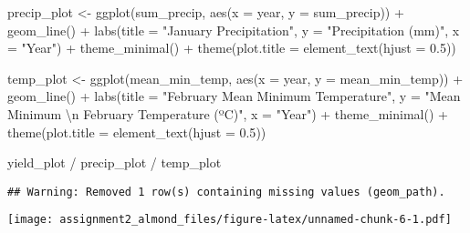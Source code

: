 \documentclass[
]{article}
\newenvironment{Shaded}{\begin{snugshade}}{\end{snugshade}}
\newcommand{\AttributeTok}[1]{\textcolor[rgb]{0.77,0.63,0.00}{#1}}
\newcommand{\FloatTok}[1]{\textcolor[rgb]{0.00,0.00,0.81}{#1}}
\newcommand{\FunctionTok}[1]{\textcolor[rgb]{0.00,0.00,0.00}{#1}}
\newcommand{\NormalTok}[1]{#1}
\newcommand{\OtherTok}[1]{\textcolor[rgb]{0.56,0.35,0.01}{#1}}
\newcommand{\SpecialCharTok}[1]{\textcolor[rgb]{0.00,0.00,0.00}{#1}}
\newcommand{\StringTok}[1]{\textcolor[rgb]{0.31,0.60,0.02}{#1}}
\begin{document}
\begin{Shaded}
\begin{Highlighting}[]
\NormalTok{precip\_plot }\OtherTok{\textless{}{-}} \FunctionTok{ggplot}\NormalTok{(sum\_precip, }\FunctionTok{aes}\NormalTok{(}\AttributeTok{x =}\NormalTok{ year, }\AttributeTok{y =}\NormalTok{ sum\_precip)) }\SpecialCharTok{+}
  \FunctionTok{geom\_line}\NormalTok{() }\SpecialCharTok{+}
  \FunctionTok{labs}\NormalTok{(}\AttributeTok{title =} \StringTok{"January Precipitation"}\NormalTok{, }\AttributeTok{y =} \StringTok{"Precipitation (mm)"}\NormalTok{, }\AttributeTok{x =} \StringTok{"Year"}\NormalTok{) }\SpecialCharTok{+}
  \FunctionTok{theme\_minimal}\NormalTok{() }\SpecialCharTok{+}
  \FunctionTok{theme}\NormalTok{(}\AttributeTok{plot.title =} \FunctionTok{element\_text}\NormalTok{(}\AttributeTok{hjust =} \FloatTok{0.5}\NormalTok{))}

\NormalTok{temp\_plot }\OtherTok{\textless{}{-}} \FunctionTok{ggplot}\NormalTok{(mean\_min\_temp, }\FunctionTok{aes}\NormalTok{(}\AttributeTok{x =}\NormalTok{ year, }\AttributeTok{y =}\NormalTok{ mean\_min\_temp)) }\SpecialCharTok{+}
  \FunctionTok{geom\_line}\NormalTok{() }\SpecialCharTok{+}
  \FunctionTok{labs}\NormalTok{(}\AttributeTok{title =} \StringTok{"February Mean Minimum Temperature"}\NormalTok{, }\AttributeTok{y =} \StringTok{"Mean Minimum }\SpecialCharTok{\textbackslash{}n}\StringTok{ February Temperature (ºC)"}\NormalTok{, }\AttributeTok{x =} \StringTok{"Year"}\NormalTok{) }\SpecialCharTok{+}
  \FunctionTok{theme\_minimal}\NormalTok{() }\SpecialCharTok{+}
  \FunctionTok{theme}\NormalTok{(}\AttributeTok{plot.title =} \FunctionTok{element\_text}\NormalTok{(}\AttributeTok{hjust =} \FloatTok{0.5}\NormalTok{))}
\end{Highlighting}
\end{Shaded}

\begin{Shaded}
\begin{Highlighting}[]
\NormalTok{yield\_plot }\SpecialCharTok{/}\NormalTok{ precip\_plot }\SpecialCharTok{/}\NormalTok{ temp\_plot}
\end{Highlighting}
\end{Shaded}

\begin{verbatim}
## Warning: Removed 1 row(s) containing missing values (geom_path).
\end{verbatim}

\texttt{[image: assignment2\_almond\_files/figure-latex/unnamed-chunk-6-1.pdf]}
\end{document}
